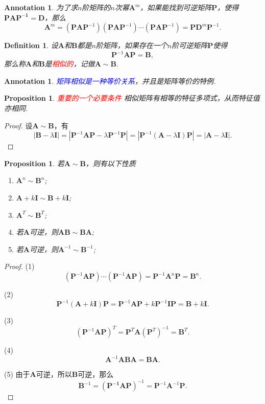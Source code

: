 \documentclass{article}
\newtheorem{proposition}[theorem]{Proposition}
\newtheorem{definition}[theorem]{Definition}
\newtheorem{annotation}[theorem]{Annotation}
\newcommand{\mbf}[1]{\bm{#1}}
\newcommand{\redt}[1]{\textcolor{red}{#1}}
\newcommand{\bluet}[1]{\textcolor{blue}{#1}}
\begin{document}
\begin{annotation}
\rm 为了求$n$阶矩阵的$n$次幂$\mbf{A}^m$，如果能找到可逆矩阵$\mbf{P}$，使得$\mbf{P}\mbf{A}\mbf{P^{-1}} = \mbf{D}$，那么
$$
\mbf{A}^m = (\mbf{P}\mbf{A}\mbf{P}^{-1})(\mbf{P}\mbf{A}\mbf{P}^{-1})\cdots(\mbf{P}\mbf{A}\mbf{P}^{-1}) = \mbf{P}\mbf{D}^m\mbf{P}^{-1}. 
$$
\end{annotation}

\begin{definition}
\rm 设$\mbf{A}$和$\mbf{B}$都是$n$阶矩阵，如果存在一个$n$阶可逆矩阵$\mbf{P}$使得
$$
\mbf{P}^{-1}\mbf{A}\mbf{P} = \mbf{B},
$$
那么称$\mbf{A}$和$\mbf{B}$是\redt{相似的}，记做$\mbf{A} \sim \mbf{B}$.
\end{definition}

\begin{annotation}
\rm \bluet{矩阵相似是一种等价关系}，并且是矩阵等价的特例.  
\end{annotation}

\begin{proposition}\label{similar-matrix: same-characteristic-values}
\rm \redt{重要的一个必要条件} 相似矩阵有相等的特征多项式，从而特征值亦相同. 
\end{proposition}

\begin{proof}
设$\mbf{A} \sim \mbf{B}$，有
$$
|\mbf{B} - \lambda\mbf{I}| = |\mbf{P}^{-1}\mbf{A}\mbf{P} -\lambda\mbf{P}^{-1}\mbf{P}| = |\mbf{P}^{-1}(\mbf{A}-\lambda\mbf{I})\mbf{P}| =|\mbf{A}-\lambda\mbf{I}|.
$$
\end{proof}

\begin{proposition}
\rm 若$\mbf{A} \sim \mbf{B}$，则有以下性质
\begin{enumerate}
	\item $\mbf{A}^n \sim \mbf{B}^n$;
	\item $\mbf{A}+k\mbf{I} \sim  \mbf{B}+k\mbf{I}$;
	\item $\mbf{A}^T \sim \mbf{B}^T$;
	\item 若$\mbf{A}$可逆，则$\mbf{AB} \sim \mbf{BA}$;
	\item 若$\mbf{A}$可逆，则$\mbf{A}^{-1} \sim \mbf{B}^{-1}$;
\end{enumerate}
\end{proposition}

\begin{proof}
(1) 
$$
(\mbf{P}^{-1}\mbf{A}\mbf{P})\cdots (\mbf{P}^{-1}\mbf{A}\mbf{P}) = \mbf{P}^{-1}\mbf{A}^n\mbf{P} = \mbf{B}^n.
$$

(2) 
$$
\mbf{P}^{-1}(\mbf{A}+k\mbf{I})\mbf{P} = \mbf{P}^{-1}\mbf{A}\mbf{P} + k\mbf{P}^{-1}\mbf{I}\mbf{P} = \mbf{B} + k\mbf{I}.
$$

(3)
$$
(\mbf{P}^{-1}\mbf{A}\mbf{P})^T =\mbf{P}^{T}\mbf{A}(\mbf{P}^T)^{-1} = \mbf{B}^T.  
$$ 

(4) 
$$
\mbf{A}^{-1}\mbf{AB}\mbf{A} = \mbf{BA}. 
$$

(5) 由于$\mbf{A}$可逆，所以$\mbf{B}$可逆，那么
$$
\mbf{B}^{-1} =(\mbf{P^{-1}}\mbf{A}\mbf{P})^{-1} = \mbf{P}^{-1}\mbf{A}^{-1}\mbf{P}.  
$$
\end{proof}
\end{document}
